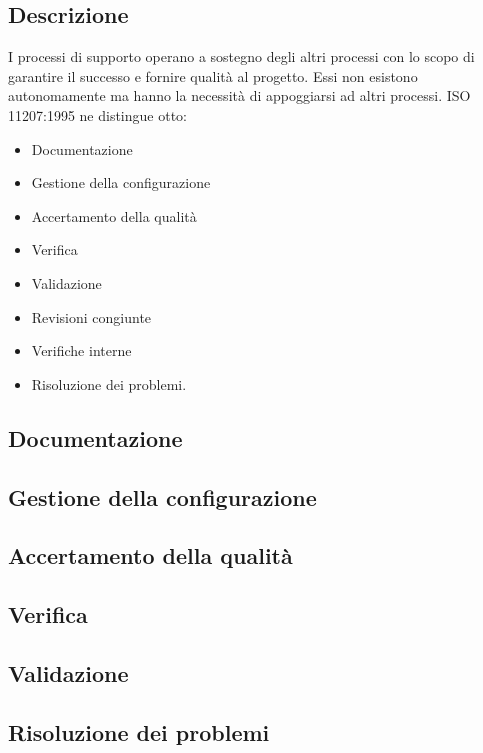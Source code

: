 \documentclass[../norme-di-progetto.tex]{subfiles}
\begin{document}
\subsection{Descrizione}%
\label{sub:processi_di_supporto/descrizione}

I processi di supporto operano a sostegno degli altri processi con lo scopo di garantire il successo e fornire qualità al progetto.
Essi non esistono autonomamente ma hanno la necessità di appoggiarsi ad altri processi.
ISO 11207:1995 ne distingue otto:

\begin{itemize}
  \item Documentazione
  \item Gestione della configurazione
  \item Accertamento della qualità
  \item Verifica
  \item Validazione
  \item Revisioni congiunte
  \item Verifiche interne
  \item Risoluzione dei problemi.
\end{itemize}

\subsection{Documentazione}%
\label{sub:documentazione}



\subsection{Gestione della configurazione}%
\label{sub:gestione_della_configurazione}



\subsection{Accertamento della qualità}%
\label{subs:accertamento_della_qualita}



\subsection{Verifica}%
\label{sub:verifica}



\subsection{Validazione}%
\label{sub:validazione}



\subsection{Risoluzione dei problemi}%
\label{sub:risoluzione_dei_problemi}


\end{document}
